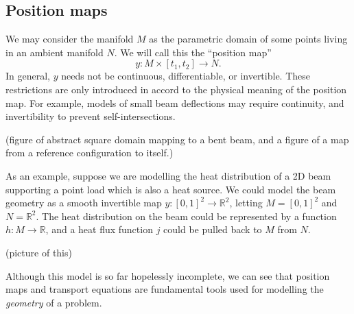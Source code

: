 \documentclass[11pt,a4paper]{memoir}
\begin{document}
\subsection{Position maps}
We may consider the manifold $M$ as the parametric domain of some points living in an ambient manifold $N$.
We will call this the ``position map''
    $$y:M\times [t_1, t_2] \rightarrow N.$$
In general, $y$ needs not be continuous, differentiable, or invertible.
These restrictions are only introduced in accord to the physical meaning of the position map. For example, models of small beam deflections
may require continuity, and invertibility to prevent self-intersections.

\vskip 0.2in
(figure of abstract square domain mapping to a bent beam, and a figure of a map from a reference configuration to itself.)
\vskip 0.2in

As an example, suppose we are modelling the heat distribution of a 2D beam supporting a point load which is also a heat source.
We could model the beam geometry as a smooth invertible map $y: [0,1]^2\rightarrow \mathbb{R}^2$,
letting $M = [0,1]^2$ and $N = \mathbb{R}^2$. The heat distribution on the beam could be represented
by a function $h : M \rightarrow \mathbb{R}$, and a heat flux function $j$ could be pulled back to $M$ from $N$.

\vskip 0.2in
(picture of this)
\vskip 0.2in

Although this model is so far hopelessly incomplete, we can see that position maps and transport equations are fundamental tools
used for modelling the \textit{geometry} of a problem.


% 
% 
\end{document}
